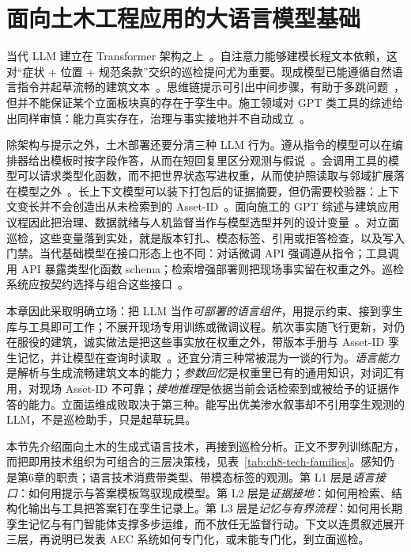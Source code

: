 \section{面向土木工程应用的大语言模型基础}
\label{sec:ch8-llm-foundations}

当代 LLM 建立在 Transformer 架构之上~\cite{vaswani2017attention}。自注意力能够建模长程文本依赖，这对``症状 + 位置 + 规范条款''交织的巡检提问尤为重要。现成模型已能遵循自然语言指令并起草流畅的建筑文本~\cite{brown2020,ouyang2022instructgpt}。思维链提示可引出中间步骤，有助于多跳问题~\cite{wei2022cot}，但并不能保证某个立面板块真的存在于孪生中。施工领域对 GPT 类工具的综述给出同样审慎：能力真实存在，治理与事实接地并不自动成立~\cite{saka2024gptconstruction}。


除架构与提示之外，土木部署还要分清三种 LLM 行为。遵从指令的模型可以在编排器给出模板时按字段作答，从而在短回复里区分观测与假说~\cite{ouyang2022instructgpt,brown2020}。会调用工具的模型可以请求类型化函数，而不把世界状态写进权重，从而使护照读取与邻域扩展落在模型之外~\cite{schick2023toolformer,yao2023react}。长上下文模型可以装下打包后的证据摘要，但仍需要校验器：上下文变长并不会创造出从未检索到的 Asset-ID~\cite{lewis2020,ji2023,liang2023helm}。面向施工的 GPT 综述与建筑应用议程因此把治理、数据就绪与人机监督当作与模型选型并列的设计变量~\cite{saka2024gptconstruction,ma2026tenquestions}。对立面巡检，这些变量落到实处，就是版本钉扎、模态标签、引用或拒答检查，以及写入门禁。当代基础模型在接口形态上也不同：对话微调 API 强调遵从指令；工具调用 API 暴露类型化函数 schema；检索增强部署则把现场事实留在权重之外。巡检系统应按契约选择与组合这些接口~\cite{ouyang2022instructgpt,schick2023toolformer,lewis2020,saka2024gptconstruction}。



本章因此采取明确立场：把 LLM 当作\emph{可部署的语言组件}，用提示约束、接到孪生库与工具即可工作；不展开现场专用训练或微调议程。航次事实随飞行更新，对仍在服役的建筑，诚实做法是把这些事实放在权重之外，带版本手册与 Asset-ID 孪生记忆，并让模型在查询时读取~\cite{lewis2020,krutli2025fmrags}。还宜分清三种常被混为一谈的行为。\emph{语言能力}是解析与生成流畅建筑文本的能力；\emph{参数回忆}是权重里已有的通用知识，对词汇有用，对现场 Asset-ID 不可靠；\emph{接地推理}是依据当前会话检索到或被给予的证据作答的能力。立面运维成败取决于第三种。能写出优美渗水叙事却不引用孪生观测的 LLM，不是巡检助手，只是起草玩具。

本节先介绍面向土木的生成式语言技术，再接到巡检分析。正文不罗列训练配方，而把即用技术组织为可组合的三层决策栈，见表~\ref{tab:ch8-tech-families}。感知仍是第6章的职责；语言技术消费带类型、带模态标签的观测。第 L1 层是\emph{语言接口}：如何用提示与答案模板驾驭现成模型。第 L2 层是\emph{证据接地}：如何用检索、结构化输出与工具把答案钉在孪生记录上。第 L3 层是\emph{记忆与有界流程}：如何用长期孪生记忆与有门智能体支撑多步运维，而不放任无监督行动。下文以连贯叙述展开三层，再说明已发表 AEC 系统如何专门化，或未能专门化，到立面巡检。

